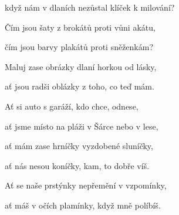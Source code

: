 když nám v dlaních nezůstal klíček k milování?

Čím jsou šaty z brokátů proti vůni akátu,

čím jsou barvy plakátů proti sněženkám?

\bigskip

Maluj zase obrázky dlaní horkou od lásky,

ať jsou radši oblázky z toho, co teď mám.
\ks



\zr
Ať si auto s garáží, kdo chce, odnese,

ať jsme místo na pláži v Šárce nebo v lese,

ať mám zase hrníčky vyzdobené sluníčky,

ať nás nesou koníčky, kam, to dobře víš.

\bigskip


Ať se naše prstýnky nepřemění v vzpomínky,

ať máš v očích plamínky, když mně políbíš.
\kr
\kp
